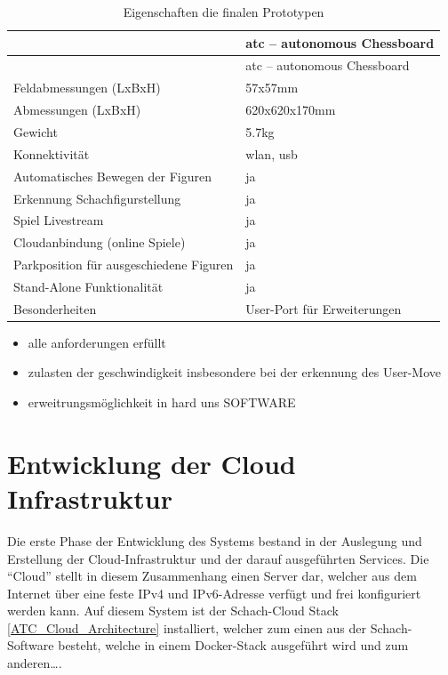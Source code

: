 \begin{longtable}[]{@{}ll@{}}
\caption{Eigenschaften die finalen Prototypen}\tabularnewline
\toprule
& \gls{atc} -- autonomous Chessboard\tabularnewline
\midrule
\endfirsthead
\toprule
& \gls{atc} -- autonomous Chessboard\tabularnewline
\midrule
\endhead
Feldabmessungen (LxBxH) & 57x57mm\tabularnewline
Abmessungen (LxBxH) & 620x620x170mm\tabularnewline
Gewicht & 5.7kg\tabularnewline
Konnektivität & \gls{wlan}, \gls{usb}\tabularnewline
Automatisches Bewegen der Figuren & ja\tabularnewline
Erkennung Schachfigurstellung & ja\tabularnewline
Spiel Livestream & ja\tabularnewline
Cloudanbindung (online Spiele) & ja\tabularnewline
Parkposition für ausgeschiedene Figuren & ja\tabularnewline
Stand-Alone Funktionalität & ja\tabularnewline
Besonderheiten & User-Port für Erweiterungen\tabularnewline
\bottomrule
\end{longtable}

\begin{itemize}
\tightlist
\item
  alle anforderungen erfüllt
\item
  zulasten der geschwindigkeit insbesondere bei der erkennung des
  User-Move
\item
  erweitrungsmöglichkeit in hard uns SOFTWARE
\end{itemize}

\hypertarget{entwicklung-der-cloud-infrastruktur}{%
\chapter{Entwicklung der Cloud
Infrastruktur}\label{entwicklung-der-cloud-infrastruktur}}

Die erste Phase der Entwicklung des Systems bestand in der Auslegung und
Erstellung der Cloud-Infrastruktur und der darauf ausgeführten Services.
Die ``Cloud'' stellt in diesem Zusammenhang einen Server dar, welcher
aus dem Internet über eine feste IPv4 und IPv6-Adresse verfügt und frei
konfiguriert werden kann. Auf diesem System ist der Schach-Cloud Stack
\ref{ATC_Cloud_Architecture} installiert, welcher zum einen aus der
Schach-Software besteht, welche in einem Docker-Stack ausgeführt wird
und zum anderen\ldots{}.

